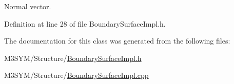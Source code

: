 Normal vector. 



Definition at line 28 of file Boundary\+Surface\+Impl.\+h.



The documentation for this class was generated from the following files\+:\begin{DoxyCompactItemize}
\item 
M3\+S\+Y\+M/\+Structure/\hyperlink{BoundarySurfaceImpl_8h}{Boundary\+Surface\+Impl.\+h}\item 
M3\+S\+Y\+M/\+Structure/\hyperlink{BoundarySurfaceImpl_8cpp}{Boundary\+Surface\+Impl.\+cpp}\end{DoxyCompactItemize}
